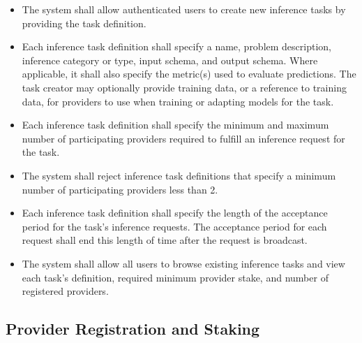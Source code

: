 \documentclass[12pt]{article}
\newcounter{reqnum} %
\begin{document}
\noindent \begin{itemize}

\item[FR\refstepcounter{reqnum}\thereqnum \label{FR_InferenceTaskCreation}:] The system shall allow authenticated users to create new inference tasks by providing the task definition.

\item[FR\refstepcounter{reqnum}\thereqnum \label{FR_InferenceTaskDefinition}:] Each inference task definition shall specify a name, problem description, inference category or type, input schema, and output schema. Where applicable, it shall also specify the metric(s) used to evaluate predictions. The task creator may optionally provide training data, or a reference to training data, for providers to use when training or adapting models for the task.

\item[FR\refstepcounter{reqnum}\thereqnum \label{FR_TaskMinimumProviders}:] Each inference task definition shall specify the minimum and maximum number of participating providers required to fulfill an inference request for the task.

\item[FR\refstepcounter{reqnum}\thereqnum \label{FR_MinimumProvidersFloor}:] The system shall reject inference task definitions that specify a minimum number of participating providers less than 2.


\item[FR\refstepcounter{reqnum}\thereqnum \label{FR_TaskAcceptancePeriod}:] Each inference task definition shall specify the length of the acceptance period for the task's inference requests. The acceptance period for each request shall end this length of time after the request is broadcast.


\item[FR\refstepcounter{reqnum}\thereqnum \label{FR_TaskBrowsing}:] The system shall allow all users to browse existing inference tasks and view each task's definition, required minimum provider stake, and number of registered providers.

\end{itemize}

\subsection{Provider Registration and Staking}
\end{document}
